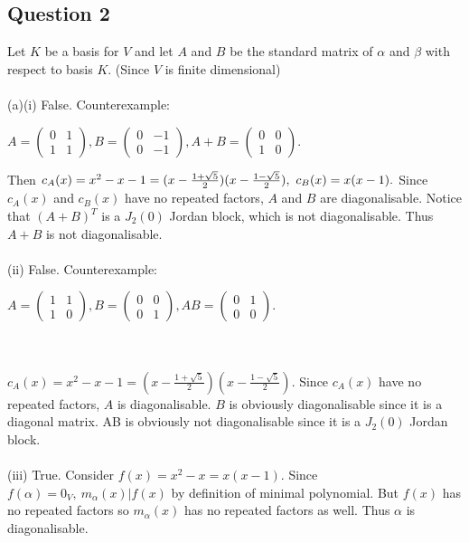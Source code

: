 \documentclass{article}
\begin{document}
\subsection*{Question 2}
Let $K$ be a basis for $V$ and let $A$ and $B$ be the standard matrix of $\alpha$ and $\beta$ with respect to basis $K$. (Since $V$ is finite dimensional)\\\\
(a)(i) False. Counterexample:\begin{center}
$A = \begin{pmatrix}
0 & 1\\
1 & 1\end{pmatrix} ,  B = \begin{pmatrix}
0 & -1\\
0 & -1\end{pmatrix} , A+B = \begin{pmatrix}
0 & 0\\
1 & 0\end{pmatrix}.$
\end{center}Then $c_A(x) = x^2-x-1 = (x-\frac{1+\sqrt{5}}{2})(x-\frac{1-\sqrt{5}}{2}),\ c_B(x) = x(x-1). \\$ Since $c_A(x)$ and $c_B(x)$ have no repeated factors, $A$ and $B$ are diagonalisable. Notice that $(A+B)^T$ is a $J_2(0) $ Jordan block, which is not diagonalisable. Thus $A+B$ is not diagonalisable.\\\\
(ii) False. Counterexample:\begin{center}
$A = \begin{pmatrix}
1 & 1\\
1 & 0\end{pmatrix} ,  B = \begin{pmatrix}
0 & 0\\
0 & 1\end{pmatrix} , AB = \begin{pmatrix}
0 & 1\\
0 & 0\end{pmatrix}.$
\end{center}\\\\
$c_A(x) = x^2-x-1 = (x-\frac{1+\sqrt{5}}{2})(x-\frac{1-\sqrt{5}}{2})$. Since $c_A(x)$ have no repeated factors, $A$ is diagonalisable. $B$ is obviously diagonalisable since it is a diagonal matrix. AB is obviously not diagonalisable since it is a $J_2(0)$ Jordan block.\\\\
(iii) True. Consider $f(x) = x^2 - x = x(x-1).$ Since $f(\alpha) = 0_V,\ m_\alpha(x)|f(x)$ by definition of minimal polynomial. But $f(x)$ has no repeated factors so $m_\alpha(x)$ has no repeated factors as well. Thus $\alpha$ is diagonalisable.\\\\
\end{document}
